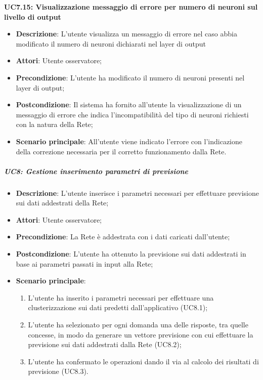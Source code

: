 \textbf{UC7.15: Visualizzazione messaggio di errore per numero di neuroni sul livello di output}\mbox{}
\label{UC7.15: Visualizzazione messaggio di errore per numero di neuroni sul livello di output}
\noindent
\begin{itemize}
\item \textbf{Descrizione}: L'utente visualizza un messaggio di errore nel caso abbia modificato il numero di neuroni dichiarati nel layer di output
\item \textbf{Attori}: Utente osservatore;
\item \textbf{Precondizione}: L'utente ha modificato il numero di neuroni presenti nel layer di output;
\item \textbf{Postcondizione}: Il sistema ha fornito all'utente la visualizzazione di un messaggio di errore che indica  l'incompatibilit\`a del tipo di neuroni richiesti con la natura della Rete;
\item \textbf{Scenario principale}: All'utente viene indicato l'errore con l'indicazione della correzione necessaria per il corretto funzionamento dalla Rete.
\end{itemize}

\subparagraph{UC8: Gestione inserimento parametri di previsione}\mbox{}
\label{UC8: Gestione inserimento parametri di previsione}
\noindent
\begin{itemize}
\item \textbf{Descrizione}: L'utente inserisce i parametri necessari per effettuare previsione sui dati addestrati della Rete;
\item \textbf{Attori}: Utente osservatore;
\item \textbf{Precondizione}: La Rete \`e addestrata con i dati caricati dall'utente;
\item \textbf{Postcondizione}: L'utente ha ottenuto la previsione sui dati addestrati in base ai parametri passati in input alla Rete;
\item \textbf{Scenario principale}:
\begin{enumerate}
\item  L'utente ha inserito i parametri necessari per effettuare una clusterizzazione sui dati predetti dall'applicativo (UC8.1);
\item L'utente ha selezionato per ogni domanda una delle risposte, tra quelle concesse, in modo da generare un vettore previsione con cui effettuare la previsione sui dati addestrati dalla Rete (UC8.2);
\item L'utente ha confermato le operazioni dando il via al calcolo dei risultati di previsione (UC8.3).
\end{enumerate}
\end{itemize}

